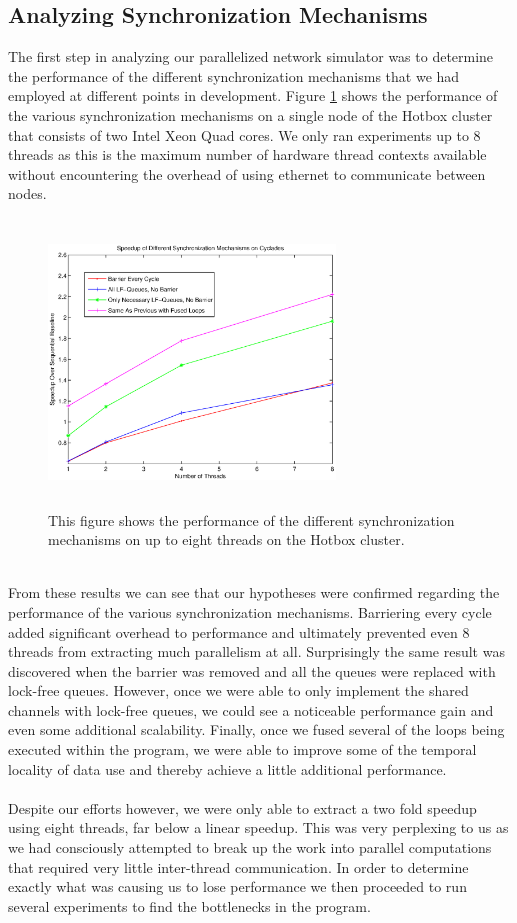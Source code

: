 \documentclass[twocolumn]{article}
\begin{document}
\subsection{Analyzing Synchronization Mechanisms}
The first step in analyzing our parallelized network simulator was to
determine the performance of the different synchronization mechanisms that
we had employed at different points in development.  Figure \ref{synch}
shows the performance of the various synchronization mechanisms on a
single node of the Hotbox cluster that consists of two Intel Xeon Quad
cores.  We only ran experiments up to 8 threads as this is the maximum
number of hardware thread contexts available without encountering the
overhead of using ethernet to communicate between nodes.\\
\begin{figure}[h]
\centering
\includegraphics[width=3in,height=3in]{synch.eps}
\caption{\label{synch} This figure shows the performance of the different
synchronization mechanisms on up to eight threads on the Hotbox cluster.}
\end{figure}
~\\
From these results we can see that our hypotheses were confirmed regarding
the performance of the various synchronization mechanisms.  Barriering
every cycle added significant overhead to performance and ultimately
prevented even 8 threads from extracting much parallelism at all.
Surprisingly the same result was discovered when the barrier was removed and
all the queues were replaced with lock-free queues.  However, once we were
able to only implement the shared channels with lock-free queues, we could see a noticeable performance gain and even some
additional scalability.  Finally, once we fused several of the loops being
executed within the program, we were able to improve some of the temporal
locality of data use and thereby achieve a little additional
performance.\\
~\\
Despite our efforts however, we were only able to extract a two fold
speedup using eight threads, far below a linear speedup.  This was very
perplexing to us as we had consciously attempted to break up the work into
parallel computations that required very little inter-thread
communication.  In order to determine exactly what was causing us to lose
performance we then proceeded to run several experiments to find the
bottlenecks in the program.
\end{document}
